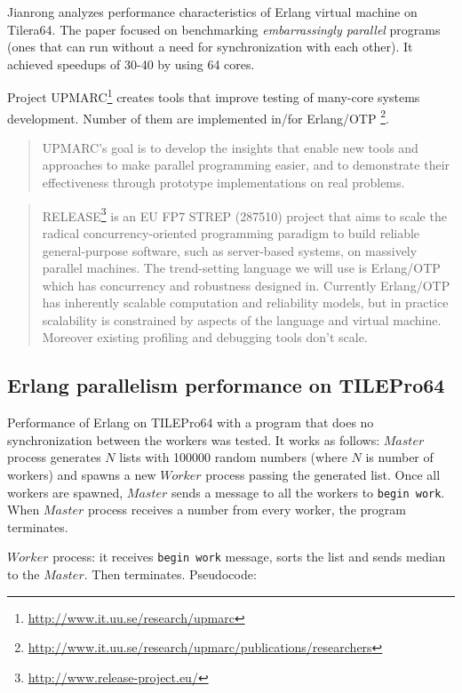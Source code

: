 \documentclass[english,11pt]{l4proj}
\begin{document}
Jianrong \cite{erlang-manycore-scalability} analyzes performance characteristics
of Erlang virtual machine on Tilera64. The paper focused on benchmarking
\emph{embarrassingly parallel} programs (ones that can run without a need for
synchronization with each other). It achieved speedups of 30-40 by using 64
cores.

Project UPMARC\footnote{\url{http://www.it.uu.se/research/upmarc}} creates tools
that improve testing of many-core systems development. Number of them are
implemented in/for
Erlang/OTP
\footnote{\url{http://www.it.uu.se/research/upmarc/publications/researchers}}.

\begin{quote}
UPMARC's goal is to develop the insights that enable new tools and approaches to
make parallel programming easier, and to demonstrate their effectiveness through
prototype implementations on real problems.
\end{quote}

\begin{quote}
RELEASE\footnote{\url{http://www.release-project.eu/}} is an EU FP7 STREP
(287510) project that aims to scale the radical concurrency-oriented programming
paradigm to build reliable general-purpose software, such as server-based
systems, on massively parallel machines. The trend-setting language we will use
is Erlang/OTP which has concurrency and robustness designed in. Currently
Erlang/OTP has inherently scalable computation and reliability models, but in
practice scalability is constrained by aspects of the language and virtual
machine. Moreover existing profiling and debugging tools don't scale.
\end{quote}

\subsection{Erlang parallelism performance on TILEPro64}

Performance of Erlang on TILEPro64 with a program that does no synchronization
between the workers was tested. It works as follows: $Master$ process generates
$N$ lists with 100000 random numbers (where $N$ is number of workers) and spawns
a new $Worker$ process passing the generated list. Once all workers are spawned,
$Master$ sends a message to all the workers to {\tt begin work}. When $Master$
process receives a number from every worker, the program terminates.

$Worker$ process: it receives {\tt begin work} message, sorts the list and
sends median to the $Master$. Then terminates. Pseudocode:
\end{document}
